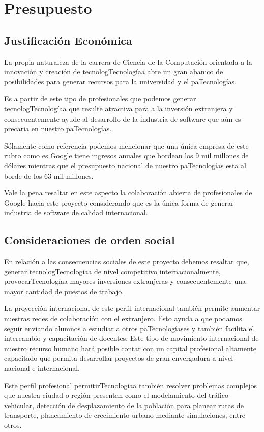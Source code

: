 \section{Presupuesto}\label{sec:cs-budget}
\subsection{Justificación Económica}
La propia naturaleza de la carrera de Ciencia de la Computación orientada a la innovación y creación de tecnologTecnologíaa abre un gran abanico de posibilidades para generar recursos para la universidad y el paTecnologías.

Es a partir de este tipo de profesionales que podemos generar tecnologTecnologíaa que resulte atractiva para a la inversión extranjera y consecuentemente ayude al desarrollo de la industria de software que aún es precaria en nuestro paTecnologías.

Sólamente como referencia podemos mencionar que una única empresa de este rubro como es Google tiene ingresos anuales que bordean los 9 mil millones de dólares mientras que el presupuesto nacional de nuestro paTecnologías esta al borde de los 63 mil millones.

Vale la pena resaltar en este aspecto la colaboración abierta de profesionales de Google hacia este proyecto considerando que es la única forma de generar industria de software de calidad internacional.

\subsection{Consideraciones de orden social}
En relación a las consecuencias sociales de este proyecto debemos resaltar que, generar tecnologTecnologíaa de nivel competitivo internacionalmente, provocarTecnologíaa mayores inversiones extranjeras y consecuentemente una mayor cantidad de puestos de trabajo.

La proyección internacional de este perfil internacional también permite aumentar nuestras redes de colaboración con el extranjero. Esto ayuda a que podamos seguir enviando alumnos a estudiar a otros paTecnologíases y también facilita el intercambio y capacitación de docentes. Este tipo de movimiento internacional de nuestro recurso humano hará posible contar con un capital profesional altamente capacitado que permita desarrollar proyectos de gran envergadura a nivel nacional e internacional.

Este perfil profesional permitirTecnologíaa también resolver problemas complejos que nuestra ciudad o región presentan como el modelamiento del tráfico vehicular, detección de desplazamiento de la población para planear rutas de transporte, planeamiento de crecimiento urbano mediante simulaciones, entre otros.

\OnlyUNSA{}

